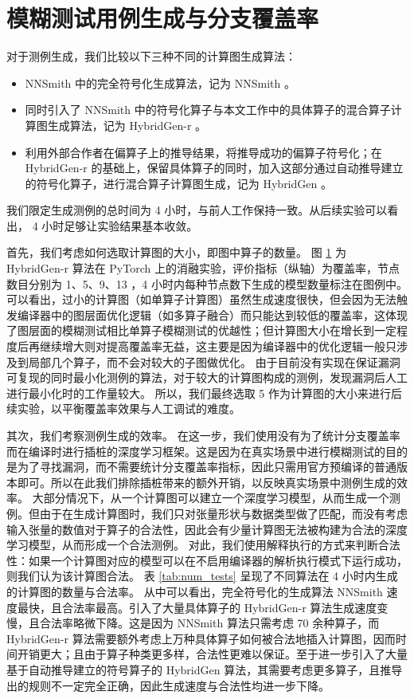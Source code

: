 \section{模糊测试用例生成与分支覆盖率}

对于测例生成，我们比较以下三种不同的计算图生成算法：
\begin{itemize}
    \item NNSmith 中的完全符号化生成算法，记为 NNSmith 。
    \item 同时引入了 NNSmith 中的符号化算子与本文工作中的具体算子的混合算子计算图生成算法，记为 HybridGen-r 。
    \item 利用外部合作者在偏算子上的推导结果，将推导成功的偏算子符号化；在 HybridGen-r 的基础上，保留具体算子的同时，加入这部分通过自动推导建立的符号化算子，进行混合算子计算图生成，记为 HybridGen 。
\end{itemize}
我们限定生成测例的总时间为 4 小时，与前人工作\cite{nnsmith,tzer}保持一致。从后续实验可以看出， 4 小时足够让实验结果基本收敛。

首先，我们考虑如何选取计算图的大小，即图中算子的数量。
图 \ref{} 为 HybridGen-r 算法在 PyTorch 上的消融实验，评价指标（纵轴）为覆盖率，节点数目分别为 1、5、9、13 ，4 小时内每种节点数下生成的模型数量标注在图例中。
可以看出，过小的计算图（如单算子计算图）虽然生成速度很快，但会因为无法触发编译器中的图层面优化逻辑（如多算子融合）而只能达到较低的覆盖率，这体现了图层面的模糊测试相比单算子模糊测试的优越性；但计算图大小在增长到一定程度后再继续增大则对提高覆盖率无益，这主要是因为编译器中的优化逻辑一般只涉及到局部几个算子，而不会对较大的子图做优化。
由于目前没有实现在保证漏洞可复现的同时最小化测例的算法，对于较大的计算图构成的测例，发现漏洞后人工进行最小化时的工作量较大。
所以，我们最终选取 5 作为计算图的大小来进行后续实验，以平衡覆盖率效果与人工调试的难度。

其次，我们考察测例生成的效率。
在这一步，我们使用没有为了统计分支覆盖率而在编译时进行插桩的深度学习框架。这是因为在真实场景中进行模糊测试的目的是为了寻找漏洞，而不需要统计分支覆盖率指标，因此只需用官方预编译的普通版本即可。所以在此我们排除插桩带来的额外开销，以反映真实场景中测例生成的效率。
大部分情况下，从一个计算图可以建立一个深度学习模型，从而生成一个测例。但由于在生成计算图时，我们只对张量形状与数据类型做了匹配，而没有考虑输入张量的数值对于算子的合法性，因此会有少量计算图无法被构建为合法的深度学习模型，从而形成一个合法测例。
对此，我们使用解释执行的方式来判断合法性：如果一个计算图对应的模型可以在不启用编译器的解析执行模式下运行成功，则我们认为该计算图合法。
表 \ref{tab:num_tests} 呈现了不同算法在 4 小时内生成的计算图的数量与合法率。
从中可以看出，完全符号化的生成算法 NNSmith 速度最快，且合法率最高。引入了大量具体算子的 HybridGen-r 算法生成速度变慢，且合法率略微下降。这是因为 NNSmith 算法只需考虑 70 余种算子，而 HybridGen-r 算法需要额外考虑上万种具体算子如何被合法地插入计算图，因而时间开销更大；且由于算子种类更多样，合法性更难以保证。至于进一步引入了大量基于自动推导建立的符号算子的 HybridGen 算法，其需要考虑更多算子，且推导出的规则不一定完全正确，因此生成速度与合法性均进一步下降。

